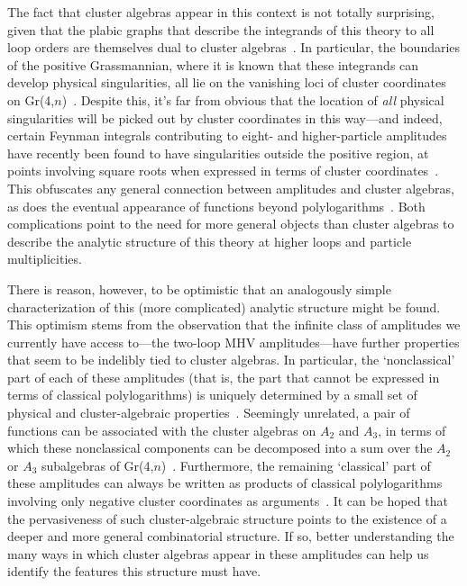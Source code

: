 \documentclass[11pt]{article}
\begin{document}
The fact that cluster algebras appear in this context is not totally surprising, given that the plabic graphs that describe the integrands of this theory to all loop orders are themselves dual to cluster algebras~\cite{ArkaniHamed:2012nw}. In particular, the boundaries of the positive Grassmannian, where it is known that these integrands can develop physical singularities, all lie on the vanishing loci of cluster coordinates on Gr(4,$n$)~\cite{ArkaniHamed:2012nw}. Despite this, it's far from obvious that the location of \emph{all} physical singularities will be picked out by cluster coordinates in this way---and indeed, certain Feynman integrals contributing to eight- and higher-particle amplitudes have recently been found to have singularities outside the positive region, at points involving square roots when expressed in terms of cluster coordinates~\cite{Prlina:2017azl,Bourjaily:2018aeq,Henn:2018cdp}. This obfuscates any general connection between amplitudes and cluster algebras, as does the eventual appearance of functions beyond polylogarithms~\cite{}. Both complications point to the need for more general objects than cluster algebras to describe the analytic structure of this theory at higher loops and particle multiplicities.

There is reason, however, to be optimistic that an analogously simple characterization of this (more complicated) analytic structure might be found. This optimism stems from the observation that the infinite class of amplitudes we currently have access to---the two-loop MHV amplitudes---have further properties that seem to be indelibly tied to cluster algebras. In particular, the `nonclassical' part of each of these amplitudes (that is, the part that cannot be expressed in terms of classical polylogarithms) is uniquely determined by a small set of physical and cluster-algebraic properties~\cite{Golden:2014pua}.  Seemingly unrelated, a pair of functions can be associated with the cluster algebras on $A_2$ and $A_3$, in terms of which these nonclassical components can be decomposed into a sum over the $A_2$ or $A_3$ subalgebras of Gr(4,$n$)~\cite{Golden:2014xqa}. Furthermore, the remaining `classical' part of these amplitudes can always be written as products of classical polylogarithms involving only negative cluster coordinates as arguments~\cite{Golden:2014xqf}. It can be hoped that the pervasiveness of such cluster-algebraic structure points to the existence of a deeper and more general combinatorial structure. If so, better understanding the many ways in which cluster algebras appear in these amplitudes can help us identify the features this structure must have.
\end{document}
